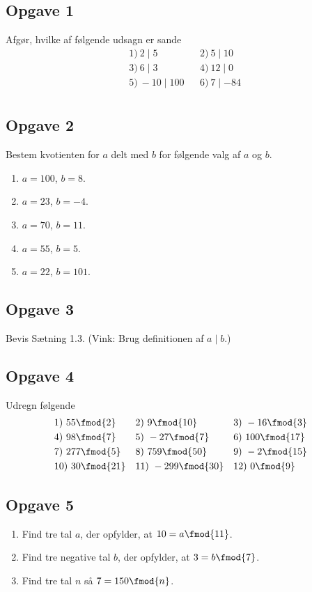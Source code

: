 \subsection*{Opgave 1}
Afgør, hvilke af følgende udsagn er sande
\begin{align*}
	&1) \ 2\mid 5  & &2) \ 5 \mid 10 \\
	&3) \ 6 \mid 3  & &4) \ 12 \mid 0 \\
	&5) \ -10 \mid 100  &  &6) \  7  \mid -84 \\
\end{align*}

\subsection*{Opgave 2}
Bestem kvotienten for $a$ delt med $b$ for følgende valg af $a$ og $b$. 
\begin{enumerate}[label=\roman*)]
	\item $a = 100$, $b = 8$.
	\item $a = 23$, $b = -4$.
	\item $a = 70$, $b = 11$.
	\item $a = 55$, $b = 5$.
	\item $a = 22$, $b = 101$.
\end{enumerate}

\subsection*{Opgave 3}
Bevis Sætning 1.3. (Vink: Brug definitionen af $a \mid b$.)
\subsection*{Opgave 4}

Udregn følgende
\begin{align*}
	&1) \ 55 \fmod{2} & &2) \ 9 \fmod{10} & &3) \ -16 \fmod{3} \\
	&4) \ 98 \fmod{7} & &5) \ -27 \fmod{7} & &6) \ 100 \fmod{17} \\
	&7) \ 277 \fmod{5} & &8) \ 759 \fmod{50} & &9) \  -2\fmod{15} \\
	&10) \ 30 \fmod{21} & &11) \ -299 \fmod{30} & &12) \ 0 \fmod{9} \\ 
\end{align*}

\subsection*{Opgave 5}
\begin{enumerate}[label=\roman*)]
	\item Find tre tal $a$, der opfylder, at $10 = a \fmod{11}$.
	\item Find tre negative tal $b$, der opfylder, at $3 = b \fmod{7}$.  
	\item Find tre tal $n$ så $7 = 150 \fmod{n}$. 
\end{enumerate}

